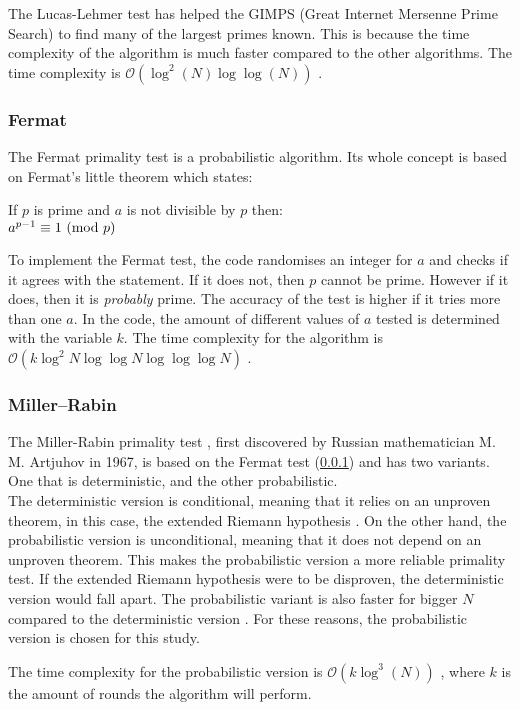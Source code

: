 \documentclass[main.tex]{subfiles}
\begin{document}
The Lucas-Lehmer test has helped the GIMPS (Great Internet Mersenne Prime
Search) \cite{GIMPS} to find many of the largest primes known. This is because
the time complexity of the algorithm is much faster compared to the other
algorithms. The time complexity is $\mathcal{O}(\log^{2}(N) \log \log (N))$
\cite{algh:lucas:time}. \\



\subsubsection{Fermat} \label{fermat}

The Fermat primality test \cite{algh:fermat} is a probabilistic algorithm. Its
whole concept is based on Fermat's little theorem \cite{fermat:little} which
states:

\begin{mdframed}
  \begin{center}
    If $p$ is prime and $a$ is not divisible by $p$ then: \\
    $a^{p - 1} \equiv 1 \ (\mathrm{mod}\ p)$
  \end{center}
\end{mdframed}

To implement the Fermat test, the code randomises an integer for $a$ and checks
if it agrees with the statement. If it does not, then $p$ cannot be prime. However
if it does, then it is \emph{probably} prime. The accuracy of the test is higher
if it tries more than one $a$.
In the code, the amount of different values of $a$ tested is determined with the variable $k$.
The time complexity for the algorithm is
$\mathcal{O}(k \log^{2}N \log \log N \log \log \log N)$ \cite{algh:fermat:time}.
\\



\subsubsection{Miller–Rabin}

The Miller-Rabin primality test \cite{algh:miller}, first discovered by Russian
mathematician M. M. Artjuhov in 1967, is based on the Fermat test (\ref{fermat})
and has two variants. One that is deterministic, and the other probabilistic. \\

The deterministic version is conditional, meaning that it relies on an unproven
theorem, in this case, the extended Riemann hypothesis \cite{riemann}. On the
other hand, the probabilistic version is unconditional, meaning that it does not
depend on an unproven theorem. This makes the probabilistic version a more
reliable primality test. If the extended Riemann hypothesis were to be
disproven, the deterministic version would fall apart. The probabilistic variant
is also faster for bigger $N$ compared to the deterministic version \cite[]{algh:miller:time}. For these
reasons, the probabilistic version is chosen for this study. \newline

The time complexity for the probabilistic version is
$\mathcal{O}(k \log^{3}(N))$ \cite[]{algh:miller:time}, where $k$ is the amount
of rounds the algorithm will perform. \\


\end{document}
